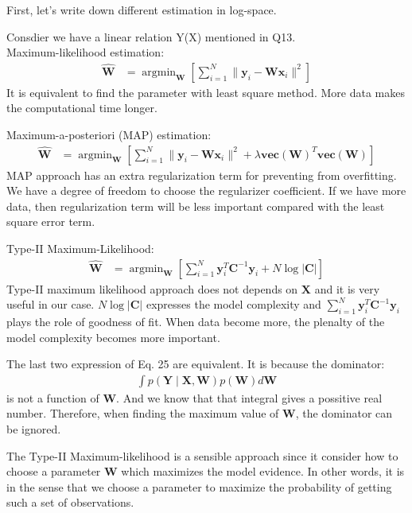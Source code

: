\documentclass[12pt]{article}
\newenvironment{question}[2][Question]{\begin{trivlist}
\kern10pt
\item[\hskip \labelsep {\bfseries #1}\hskip \labelsep {\bfseries #2.}]}{\end{trivlist}}
\begin{document}
\begin{question}{14}
First, let's write down different estimation in log-space.

Consdier we have a linear relation Y(X) mentioned in Q13.
\\ 
Maximum-likelihood estimation:
\begin{align*}
  \hat{\mathbf{W}} 
  &= \operatorname{argmin}_{\mathbf{W}}
    [\sum_{i=1}^{N} \| \mathbf{y}_i - \mathbf{W}\mathbf{x}_i\|^2]
\end{align*}
It is equivalent to find the parameter with least square method. More data makes
the computational time longer.

Maximum-a-posteriori (MAP) estimation:
\begin{align*}
  \hat{\mathbf{W}} 
  &= \operatorname{argmin}_{\mathbf{W}}
    [\sum_{i=1}^{N} \| \mathbf{y}_i - \mathbf{W}\mathbf{x}_i\|^2
      + \lambda \textbf{vec}(\textbf{W})^T\textbf{vec}(\textbf{W})]
\end{align*}
MAP approach has an extra regularization term for preventing from overfitting.
We have a degree of freedom to choose the regularizer coefficient.
If we have more data, then regularization term will be less important compared
with the least square error term.

Type-II Maximum-Likelihood:
\begin{align*}
  \hat{\mathbf{W}} 
  &= \operatorname{argmin}_{\mathbf{W}}
    [\sum_{i=1}^{N} \mathbf{y}_i^T \mathbf{C}^{-1}\mathbf{y}_i
      + N\log{|\mathbf{C}|}]
\end{align*}
Type-II maximum likelihood approach does not depends on $\mathbf{X}$ and it is
very useful in our case. $N\log{|\mathbf{C}|}$ expresses the model complexity
and $\sum_{i=1}^{N} \mathbf{y}_i^T \mathbf{C}^{-1}\mathbf{y}_i$ plays the role of
goodness of fit. When data become more, the plenalty of the model complexity becomes
more important.
  
The last two expression of Eq. 25 are equivalent. It is because the dominator:
  \begin{align*} %
    \int p(\mathbf{Y}\mid\mathbf{X}, \mathbf{W})p(\mathbf{W})d\mathbf{W}
  \end{align*}
is not a function of $\mathbf{W}$. And we know that that integral gives a possitive
 real number. Therefore, when finding the maximum value of $\mathbf{W}$, the dominator 
 can be ignored.

The Type-II Maximum-likelihood is a sensible approach since it consider how to
 choose a parameter $\mathbf{W}$ which maximizes the model evidence. In other words,
 it is in the sense that we choose a parameter to maximize the probability of 
 getting such a set of observations.
\end{question}
\end{document}
